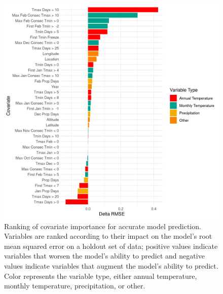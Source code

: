 \documentclass[a4paper,11pt]{article}
\begin{document}
\begin{figure}[h!]
  \includegraphics[width=\textwidth]{Figures/variableImportancePlot.png}
  \caption{Ranking of covariate importance for accurate model prediction. Variables are ranked according to their impact on the model's root mean squared error on a holdout set of data; positive values indicate variables that worsen the model's ability to predict and negative values indicate variables that augment the model's ability to predict. Color represents the variable type, either annual temperature, monthly temperature, precipitation, or other.}
  \label{fig:varImportance}
\end{figure}

\clearpage 
\end{document}
